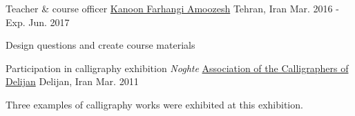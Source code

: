 \begin{cventries}
  \cventry
  {Teacher \& course officer} %
  {\href{http://www.kanoon.ir/}{Kanoon Farhangi Amoozesh}} %
  {Tehran, Iran} %
  {Mar. 2016 - Exp. Jun. 2017} %
  {
    \begin{cvitems} %
      \item {Design questions and create course materials}
    \end{cvitems}
  }

  \cventry
  {Participation in calligraphy exhibition \emph{Noghte}} %
  {\href{http://calligraphers.ir/}{Association of the Calligraphers of Delijan}} %
  {Delijan, Iran} %
  {Mar. 2011} %
  {
    \begin{cvitems} %
      \item {Three examples of calligraphy works were exhibited at this exhibition.}
    \end{cvitems}
  }

\end{cventries}

